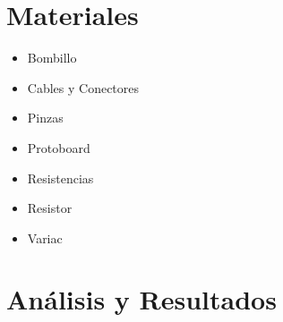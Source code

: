 \documentclass[twocolumn]{IEEEtran}
\begin{document}
\section{Materiales}
\begin{itemize}
 \item Bombillo
 \item Cables y Conectores
 \item Pinzas
 \item Protoboard
 \item Resistencias
 \item Resistor
 \item Variac
\end{itemize}


\section{Análisis y Resultados}
\end{document}
